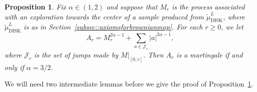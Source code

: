 \documentclass[10pt]{amsart}
\let\mathcal\mathscr
\theoremstyle{plain}
\numberwithin{theorem}{section}
\newtheorem{proposition}[theorem]{Proposition}
\theoremstyle{definition}
\newcommand{\CJ}{{\mathcal J}}
\newcommand{\tmudl}{\wt{\mu}_{\mathrm{DISK}}^L}
\let\wt\widetilde
\begin{document}
\label{subsec::martingale32}

\begin{proposition}
\label{prop::centermartingale}
Fix $\alpha \in (1,2)$ and suppose that $M_r$ is the process associated with an exploration towards the center of a sample produced from $\tmudl$, where $\tmudl$ is as in Section~\ref{subsec::axiomsforbrownianmap}. For each $r \geq 0$, we let
\begin{equation}
\label{eqn::atmartingale}
A_r = M_r^{2\alpha - 1} + \sum_{a \in \CJ_r} |a|^{2\alpha-1},
\end{equation}
where $\CJ_r$ is the set of jumps made by $M|_{[0,r]}$. Then $A_r$ is a martingale if and only if $\alpha = 3/2$.
\end{proposition}

We will need two intermediate lemmas before we give the proof of Proposition~\ref{prop::centermartingale}.
\end{document}
